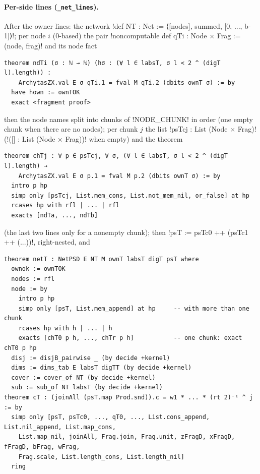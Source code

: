 {{{\paragraph{Per-side lines (\texttt{\_net\_lines}).} After the owner lines: the network
\lexlean!def NT : Net := ⟨[nodes], summed, [0, ..., b-1]⟩!; per node $i$ (0-based) the pair
\lexlean!noncomputable def qTi : Node × Frag := (node, frag)! and its node fact
\begin{lstlisting}[style=lexlean]
theorem ndTi (σ : ℕ → ℕ) (hσ : (∀ l ∈ labsT, σ l < 2 ^ (digT l).length)) :
    ArchytasZX.val E σ qTi.1 = fval M qTi.2 (dbits ownT σ) := by
  have hown := ownTOK
  exact <fragment proof>
\end{lstlisting}
then the node names split into chunks of \lexpy!NODE_CHUNK! in order (one empty chunk when there
are no nodes); per chunk $j$ the list \lexlean!psTcj : List (Node × Frag)! (\lexlean!([] : List (Node × Frag))!
when empty) and the theorem
\begin{lstlisting}[style=lexlean]
theorem chTj : ∀ p ∈ psTcj, ∀ σ, (∀ l ∈ labsT, σ l < 2 ^ (digT l).length) →
    ArchytasZX.val E σ p.1 = fval M p.2 (dbits ownT σ) := by
  intro p hp
  simp only [psTcj, List.mem_cons, List.not_mem_nil, or_false] at hp
  rcases hp with rfl | ... | rfl
  exacts [ndTa, ..., ndTb]
\end{lstlisting}
(the last two lines only for a nonempty chunk); then \lexlean!psT := psTc0 ++ (psTc1 ++ (...))!,
right-nested, and
\begin{lstlisting}[style=lexlean]
theorem netT : NetPSD E NT M ownT labsT digT psT where
  ownok := ownTOK
  nodes := rfl
  node := by
    intro p hp
    simp only [psT, List.mem_append] at hp     -- with more than one chunk
    rcases hp with h | ... | h
    exacts [chT0 p h, ..., chTr p h]           -- one chunk: exact chT0 p hp
  disj := disjB_pairwise _ (by decide +kernel)
  dims := dims_tab E labsT digTT (by decide +kernel)
  cover := cover_of NT (by decide +kernel)
  sub := sub_of NT labsT (by decide +kernel)
theorem cT : (joinAll (psT.map Prod.snd)).c = w1 * ... * (rt 2)⁻¹ ^ j := by
  simp only [psT, psTc0, ..., qT0, ..., List.cons_append, List.nil_append, List.map_cons,
    List.map_nil, joinAll, Frag.join, Frag.unit, zFragD, xFragD, fFragD, bFrag, wFrag,
    Frag.scale, List.length_cons, List.length_nil]
  ring
\end{lstlisting}

}}}
